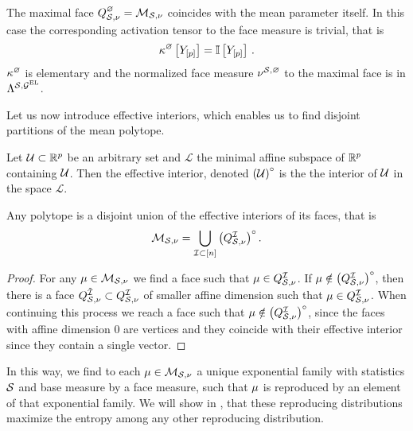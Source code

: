 \begin{example}
    \label{exa:maximalFaceMeasure}
    The maximal face $Q^{\varnothing}_{\mathcal{S},\nu}=\mathcal{M}_{\mathcal{S},\nu}$ coincides with the mean parameter itself.
    In this case the corresponding activation tensor to the face measure is trivial, that is
    \begin{align*}
        \kappa^{\varnothing}\left[Y_{[p]}\right] = \mathbb{I}\left[Y_{[p]}\right] \, .
    \end{align*}
    $\kappa^{\varnothing}$ is elementary and the normalized face measure $\nu^{\mathcal{S},\varnothing}$ to the maximal face is in $\Lambda^{\mathcal{S},\mathcal{G}^{\mathrm{EL}}}$.
\end{example}



Let us now introduce effective interiors, which enables us to find disjoint partitions of the mean polytope.

\begin{definition}
    \label{def:effectiveInterior}
    Let $\mathcal{U}\subset\mathbb{R}^{p}$ be an arbitrary set and $\mathcal{L}$ the minimal affine subspace of $\mathbb{R}^{p}$ containing $\mathcal{U}$.
    Then the effective interior, denoted ${\left(\mathcal{U}\right)}^{\circ}$ is the the interior of $\mathcal{U}$ in the space $\mathcal{L}$.
\end{definition}

\begin{lemma}
    Any polytope is a disjoint union of the effective interiors of its faces, that is
    \begin{align*}
        \mathcal{M}_{\mathcal{S},\nu} = \bigcup_{\mathcal{I}\subset[n]} {\left(Q^{\mathcal{I}}_{\mathcal{S},\nu}\right)}^{\circ} \, .
    \end{align*}
\end{lemma}
\begin{proof}
    For any $\mu\in\mathcal{M}_{\mathcal{S},\nu}$ we find a face such that $\mu\in Q^{\mathcal{I}}_{\mathcal{S},\nu}$.
    If $\mu\notin{\left(Q^{\mathcal{I}}_{\mathcal{S},\nu}\right)}^{\circ}$, then there is a face $Q^{\tilde{\mathcal{I}}}_{\mathcal{S},\nu}\subset Q^{\mathcal{I}}_{\mathcal{S},\nu}$ of smaller affine dimension such that $\mu\in Q^{\mathcal{I}}_{\mathcal{S},\nu}$.
    When continuing this process we reach a face such that $\mu\notin{\left(Q^{\mathcal{I}}_{\mathcal{S},\nu}\right)}^{\circ}$, since the faces with affine dimension $0$ are vertices and they coincide with their effective interior since they contain a single vector.
\end{proof}

In this way, we find to each $\mu\in\mathcal{M}_{\mathcal{S},\nu}$ a unique exponential family with statistics $\mathcal{S}$ and base measure by a face measure, such that $\mu$ is reproduced by an element of that exponential family.
We will show in , that these reproducing distributions maximize the entropy among any other reproducing distribution.


